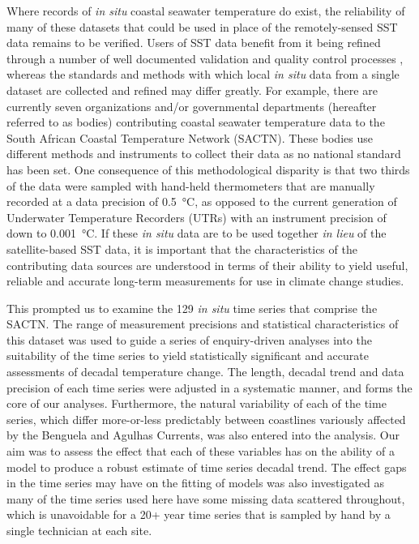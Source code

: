 \documentclass[]{ametsoc}
\begin{document}
Where records of \emph{in situ} coastal seawater temperature do exist, the reliability of many of these datasets that could be used in place of the remotely-sensed SST data remains to be verified. Users of SST data benefit from it being refined through a number of well documented validation and quality control processes \citep[\emph{e.g.}][]{Reynolds1994, Brown1999, Martin2012}, whereas the standards and methods with which local \emph{in situ} data from a single dataset are collected and refined may differ greatly. For example, there are currently seven organizations and/or governmental departments (hereafter referred to as bodies) contributing coastal seawater temperature data to the South African Coastal Temperature Network (SACTN). These bodies use different methods and instruments to collect their data as no national standard has been set. One consequence of this methodological disparity is that two thirds of the data were sampled with hand-held thermometers that are manually recorded at a data precision of \SI{0.5}{\degreeCelsius}, as opposed to the current generation of Underwater Temperature Recorders (UTRs) with an instrument precision of down to \SI{0.001}{\degreeCelsius}. If these \emph{in situ} data are to be used together \emph{in lieu} of the satellite-based SST data, it is important that the characteristics of the contributing data sources are understood in terms of their ability to yield useful, reliable and accurate long-term measurements for use in climate change studies.

This prompted us to examine the 129 \emph{in situ} time series that comprise the SACTN. The range of measurement precisions and statistical characteristics of this dataset was used to guide a series of enquiry-driven analyses into the suitability of the time series to yield statistically significant and accurate assessments of decadal temperature change. The length, decadal trend and data precision of each time series were adjusted in a systematic manner, and forms the core of our analyses. Furthermore, the natural variability of each of the time series, which differ more-or-less predictably between coastlines variously affected by the Benguela and Agulhas Currents, was also entered into the analysis. Our aim was to assess the effect that each of these variables has on the ability of a model to produce a robust estimate of time series decadal trend. The effect gaps in the time series may have on the fitting of models was also investigated as many of the time series used here have some missing data scattered throughout, which is unavoidable for a 20+ year time series that is sampled by hand by a single technician at each site.
\end{document}
